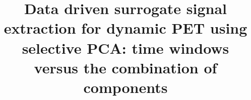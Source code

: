\documentclass[12pt]{iopart}
\begin{document}
    \title[Data driven surrogate signal extraction for dynamic PET using selective PCA]{Data driven surrogate signal extraction for dynamic PET using selective PCA: time windows versus the combination of components}
    
    
    
    
\end{document}
